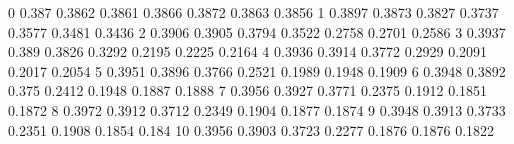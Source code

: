 0	0.387	0.3862	0.3861	0.3866	0.3872	0.3863	0.3856
1	0.3897	0.3873	0.3827	0.3737	0.3577	0.3481	0.3436
2	0.3906	0.3905	0.3794	0.3522	0.2758	0.2701	0.2586
3	0.3937	0.389	0.3826	0.3292	0.2195	0.2225	0.2164
4	0.3936	0.3914	0.3772	0.2929	0.2091	0.2017	0.2054
5	0.3951	0.3896	0.3766	0.2521	0.1989	0.1948	0.1909
6	0.3948	0.3892	0.375	0.2412	0.1948	0.1887	0.1888
7	0.3956	0.3927	0.3771	0.2375	0.1912	0.1851	0.1872
8	0.3972	0.3912	0.3712	0.2349	0.1904	0.1877	0.1874
9	0.3948	0.3913	0.3733	0.2351	0.1908	0.1854	0.184
10	0.3956	0.3903	0.3723	0.2277	0.1876	0.1876	0.1822
